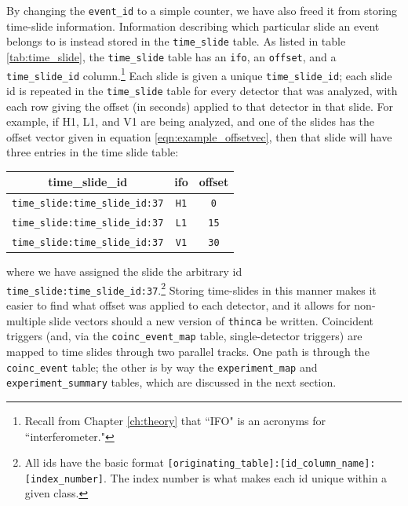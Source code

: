 By changing the \texttt{event\_id} to a simple counter, we have also freed it
from storing time-slide information. Information describing which particular
slide an event belongs to is instead stored in the \texttt{time\_slide} table.
As listed in table \ref{tab:time_slide}, the \texttt{time\_slide} table has an
\texttt{ifo}, an \texttt{offset}, and a \texttt{time\_slide\_id}
column.\footnote{Recall from Chapter \ref{ch:theory} that ``IFO" is an acronyms
for ``interferometer."} Each slide is given a unique \texttt{time\_slide\_id}; each slide
id is repeated in the \texttt{time\_slide} table for every detector that was
analyzed, with each row giving the offset (in seconds) applied to that detector
in that slide. For example, if H1, L1, and V1 are being analyzed, and one of
the slides has the offset vector given in equation
\ref{eqn:example_offsetvec}, then that slide will have three entries in the
time slide table:
\begin{center}
\begin{tabular}{ c | c | c }
time\_slide\_id & ifo & offset \\
\hline\hline
\texttt{time\_slide:time\_slide\_id:37} &   \texttt{H1}    & \texttt{0} \\
\texttt{time\_slide:time\_slide\_id:37} &   \texttt{L1}    & \texttt{15} \\
\texttt{time\_slide:time\_slide\_id:37} &   \texttt{V1}    & \texttt{30} \\
\end{tabular}
\end{center}
where we have assigned the slide the arbitrary id
\texttt{time\_slide:time\_slide\_id:37}.\footnote{All ids have the basic format
\texttt{[originating\_table]:[id\_column\_name]:[index\_number]}. The index
number is what makes each id unique within a given class.} Storing time-slides
in this manner makes it easier to find what offset was applied to each
detector, and it allows for non-multiple slide vectors should a new version of
\texttt{thinca} be written. Coincident triggers (and, via the
\texttt{coinc\_event\_map} table, single-detector triggers) are mapped to time
slides through two parallel tracks. One path is through the
\texttt{coinc\_event} table; the other is by way the \texttt{experiment\_map}
and \texttt{experiment\_summary} tables, which are discussed in the next
section.

